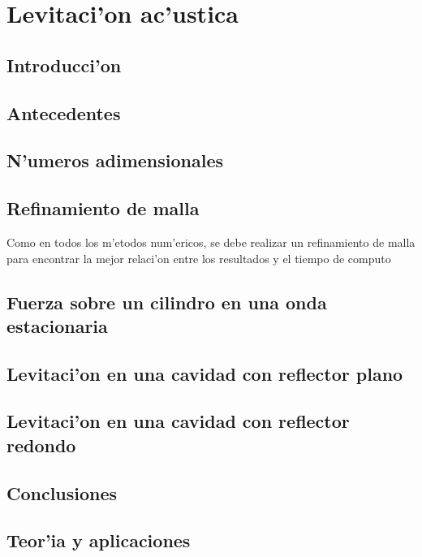 

\chapter{Levitaci'on ac'ustica}
\section{Introducci'on}
\section{Antecedentes}
\section{N'umeros adimensionales}
\section{Refinamiento de malla}
Como en todos los m'etodos num'ericos, se debe realizar un refinamiento de malla
para encontrar la mejor relaci'on entre los resultados y el tiempo de computo
\section{Fuerza sobre un cilindro en una onda estacionaria}
\section{Levitaci'on en una cavidad con reflector plano}
\section{Levitaci'on en una cavidad con reflector redondo}
\section{Conclusiones}



\section{Teor'ia y aplicaciones}

